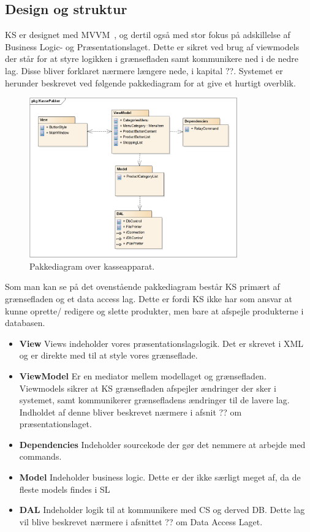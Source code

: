 \subsection{Design og struktur}
\gls{KS} er designet med MVVM~\cite{MVVM}, og dertil også med stor fokus på adskillelse af Business Logic- og Præsentationslaget. Dette er sikret ved brug af viewmodels der står for at styre logikken i grænsefladen samt kommunikere ned i de nedre lag. Disse bliver forklaret nærmere længere nede, i kapital ??.
Systemet er herunder beskrevet ved følgende pakkediagram for at give et hurtigt overblik.	

\begin{figure}[H]
	\centering
	\includegraphics[width=0.8\textwidth]{Systemdesign/Frontend/pics/KassePakker}
	\caption{Pakkediagram over kasseapparat.}
	\label{fig:EndeligeGUI}
\end{figure}

Som man kan se på det ovenstående pakkediagram består \gls{KS} primært af grænsefladen og et data access lag. Dette er fordi \gls{KS} ikke har som ansvar at kunne oprette/ redigere og slette produkter, men bare at afspejle produkterne i databasen. 

\begin{itemize}
	\item \textbf{View} Views indeholder vores præsentationslagslogik. Det er skrevet i XML og er direkte med til at style vores grænseflade.
	\item \textbf{ViewModel} Er en mediator mellem modellaget og grænsefladen. Viewmodels sikrer at \gls{KS} grænsefladen afspejler ændringer der sker i systemet, samt kommunikerer grænsefladens ændringer til de lavere lag. Indholdet af denne bliver beskrevet nærmere i afsnit ?? om præsentationslaget.
	\item \textbf{Dependencies} Indeholder sourcekode der gør det nemmere at arbejde med commands.
	\item \textbf{Model} Indeholder business logic. Dette er der ikke særligt meget af, da de fleste models findes i \gls{SL}
	\item \textbf{DAL} Indeholder logik til at kommunikere med \gls{CS} og derved \gls{DB}. Dette lag vil blive beskrevet nærmere i afsnittet ?? om Data Access Laget.
\end{itemize}



